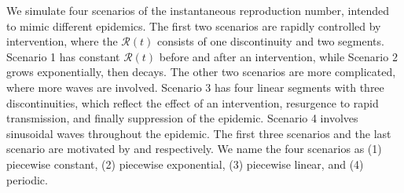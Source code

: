 \documentclass[10pt,letterpaper]{article}
\def\calR{\mathcal{R}}
\begin{document}
We simulate four scenarios of the instantaneous reproduction number, intended to
mimic different epidemics. The first two scenarios are rapidly controlled by
intervention, where the $\calR(t)$ consists of one discontinuity and two
segments. Scenario 1 has constant $\calR(t)$ before and after an intervention,
while Scenario 2 grows exponentially, then decays. The other two scenarios are
more complicated, where more waves are involved. Scenario 3 has four linear
segments with three discontinuities, which reflect the effect of an
intervention, resurgence to rapid transmission, and finally suppression of the
epidemic. Scenario 4 involves sinusoidal waves throughout the epidemic. The
first three scenarios and the last scenario are motivated by
\cite{parag2021improved} and \cite{gressani2022epilps} respectively. We name the
four scenarios as (1) piecewise constant, (2) piecewise
exponential, (3) piecewise linear, and (4) periodic.
\end{document}
